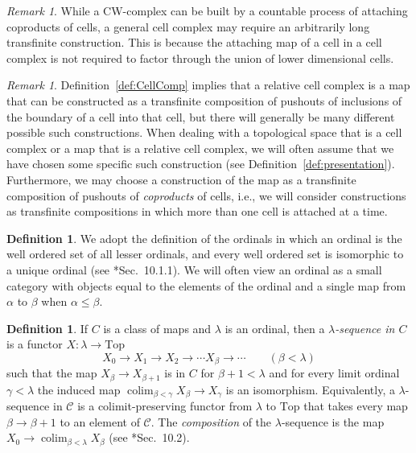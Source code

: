 \documentclass[12pt]{amsart}
\numberwithin{equation}{section}
\theoremstyle{slplain}
\theoremstyle{definition}
\newtheorem{defn}[equation]{Definition} %
\theoremstyle{remark}
\newtheorem{rem}[equation]{Remark}      %
\newcommand{\defref}{Definition~\ref}
\newcommand{\cat}[1]{\mathcal{#1}}
\DeclareMathOperator*{\colim}{colim}
\begin{document}
\begin{rem}
  \label{rem:CWcell}
  While a CW-complex can be built by a countable process of attaching
  coproducts of cells, a general cell complex may require an
  arbitrarily long transfinite construction.  This is because the
  attaching map of a cell in a cell complex is not required to factor
  through the union of lower dimensional cells.
\end{rem}


\begin{rem}
  \label{rem:CelCompPres}
  \defref{def:CellComp} implies that a relative cell complex is a map
  that can be constructed as a transfinite composition of pushouts of
  inclusions of the boundary of a cell into that cell, but there will
  generally be many different possible such constructions.  When
  dealing with a topological space that is a cell complex or a map
  that is a relative cell complex, we will often assume that we have
  chosen some specific such construction (see
  \defref{def:presentation}).  Furthermore, we may choose a
  construction of the map as a transfinite composition of pushouts of
  \emph{coproducts} of cells, i.e., we will consider constructions as
  transfinite compositions in which more than one cell is attached at
  a time.
\end{rem}


\begin{defn}
  \label{def:ordinal}
  We adopt the definition of the ordinals in which an ordinal is the
  well ordered set of all lesser ordinals, and every well ordered set
  is isomorphic to a unique ordinal (see \cite{MCATL}*{Sec.~10.1.1}).
  We will often view an ordinal as a small category with objects equal
  to the elements of the ordinal and a single map from $\alpha$ to
  $\beta$ when $\alpha \le \beta$.
\end{defn}

\begin{defn}
  \label{def:lambdaseq}
  If $C$ is a class of maps and $\lambda$ is an ordinal, then a
  \emph{$\lambda$-sequence in $C$} is a functor $X\colon \lambda \to
  \mathrm{Top}$
  \begin{displaymath}
    X_{0} \to X_{1} \to X_{2} \to \cdots X_{\beta} \to \cdots
    \qquad (\beta < \lambda)
  \end{displaymath}
  such that the map $X_{\beta} \to X_{\beta+1}$ is in $C$ for $\beta+1
  < \lambda$ and for every limit ordinal $\gamma < \lambda$ the
  induced map $\colim_{\beta<\gamma} X_{\beta} \to X_{\gamma}$ is an
  isomorphism.  Equivalently, a $\lambda$-sequence in $\cat C$ is a
  colimit-preserving functor from $\lambda$ to $\mathrm{Top}$ that
  takes every map $\beta \to \beta+1$ to an element of $\cat C$.  The
  \emph{composition} of the $\lambda$-sequence is the map $X_{0} \to
  \colim_{\beta<\lambda}X_{\beta}$ (see \cite{MCATL}*{Sec.~10.2}).
\end{defn}
\end{document}
